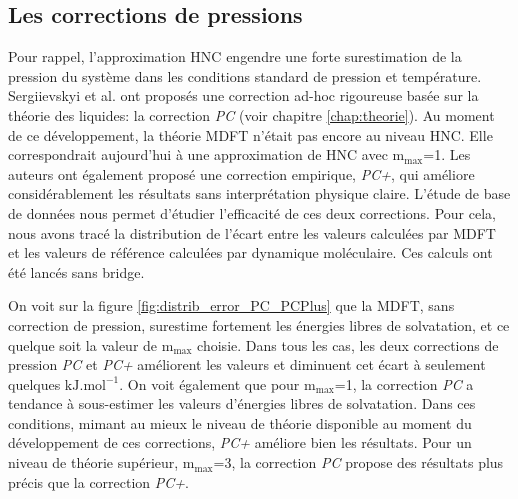 \subsection{Les corrections de pressions}\label{sec:corrections_pression}
Pour rappel, l'approximation HNC engendre une forte surestimation de la pression du système dans les conditions standard de pression et température. Sergiievskyi et al. \cite{sergiievskyi_solvation_2015,sergiievskyi_pressure_2015} ont proposés une correction ad-hoc rigoureuse basée sur la théorie des liquides: la correction \textit{PC} (voir chapitre \ref{chap:theorie}). Au moment de ce développement, la théorie MDFT n'était pas encore au niveau HNC. Elle correspondrait aujourd'hui à une approximation de HNC avec $\mathrm{m}_\mathrm{max}$=1. Les auteurs ont également proposé une correction empirique, \textit{PC+}, qui améliore considérablement les résultats sans interprétation physique claire. L'étude de base de données nous permet d'étudier l'efficacité de ces deux corrections. Pour cela, nous avons tracé la distribution de l'écart entre les valeurs calculées par MDFT et les valeurs de référence calculées par dynamique moléculaire. Ces calculs ont été lancés sans bridge.%

On voit sur la figure \ref{fig:distrib_error_PC_PCPlus} que la MDFT, sans correction de pression, surestime fortement les énergies libres de solvatation, et ce quelque soit la valeur de $\mathrm{m}_\mathrm{max}$ choisie. Dans tous les cas, les deux corrections de pression \textit{PC} et \textit{PC+} améliorent les valeurs et diminuent cet écart à seulement quelques $\mathrm{kJ.mol}^{-1}$. On voit également que pour $\mathrm{m}_\mathrm{max}$=1, la correction \textit{PC} a tendance à sous-estimer les valeurs d'énergies libres de solvatation. Dans ces conditions, mimant au mieux le niveau de théorie disponible au moment du développement de ces corrections, \textit{PC+} améliore bien les résultats. Pour un niveau de théorie supérieur, $\mathrm{m}_\mathrm{max}$=3, la correction \textit{PC} propose des résultats plus précis que la correction \textit{PC+}.

